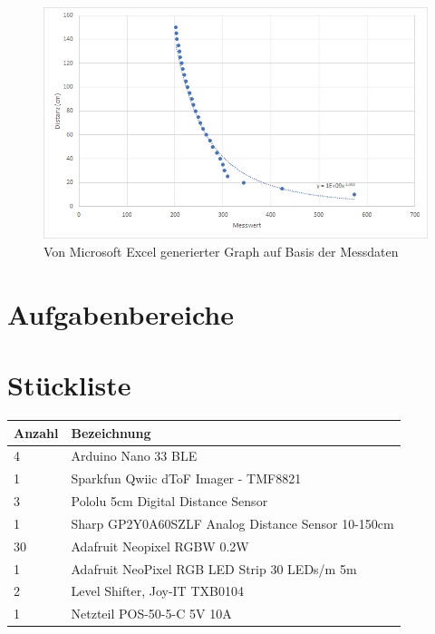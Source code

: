         \begin{figure}[H]
            \begin{center}
                \includegraphics[width=12cm]{media/03_technical_implementation/calibration.png}                
            \end{center}
            \caption{Von Microsoft Excel generierter Graph auf Basis der Messdaten}
            \label{fig:calibration}
        \end{figure}

    \section{Aufgabenbereiche}


\section{Stückliste}
    \begin{table}[H]
        \centering
        \begin{tabularx}{\textwidth}{ | l | X | }\hline
            \textbf{Anzahl} & \textbf{Bezeichnung} \\\hline
            4               & Arduino Nano 33 BLE \\\hline
            1               & Sparkfun Qwiic dToF Imager - TMF8821 \\\hline
            3               & Pololu 5cm Digital Distance Sensor \\\hline
            1               & Sharp GP2Y0A60SZLF Analog Distance Sensor 10-150cm \\\hline
            30              & Adafruit Neopixel RGBW 0.2W \\\hline            1               & Adafruit NeoPixel RGB LED Strip 30 LEDs/m 5m \\\hline
            2               & Level Shifter, Joy-IT TXB0104 \\\hline
            1               & Netzteil POS-50-5-C 5V 10A \\\hline
        \end{tabularx}
    \end{table}

